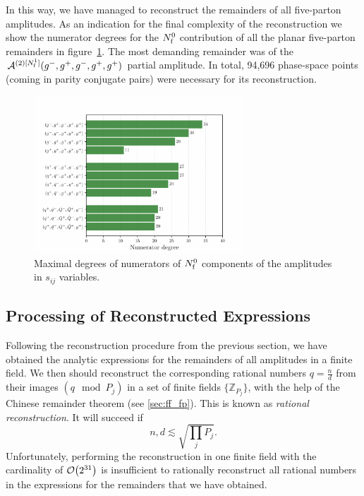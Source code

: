 In this way, we have managed to reconstruct the remainders of all five-parton amplitudes.
As an indication for the final complexity of the reconstruction we show the
numerator degrees for the $N_\mathrm{f}^0$ contribution of all the planar five-parton
remainders in figure~\ref{fig:degrees-all}.
The most demanding remainder was of the $\mathcal{A}^{(2)[N_\mathrm{f}^1]}(g^-,g^+,g^-,g^+,g^+)$ partial amplitude.
In total, 94,696 phase-space points  (coming in parity conjugate pairs) were necessary for its reconstruction.

\begin{figure}[ht]
  \centering
  \includegraphics[width = 0.7\textwidth]{plots/plot_sijs.pdf}
  \caption{Maximal degrees of numerators of $N_\mathrm{f}^0$ components of the amplitudes in $s_{ij}$ variables.}
  \label{fig:degrees-all}
\end{figure}



\subsection{Processing of Reconstructed Expressions}

Following the reconstruction procedure from the previous section, we have obtained the analytic expressions
for the remainders of all amplitudes in a finite field.
We then should reconstruct the corresponding rational numbers $q=\frac{n}{d}$ from
their images $(q \mod P_j)$ in a set of finite fields $\{\mathbb{Z}_{P_j}\}$, 
with the help of the Chinese remainder theorem (see \cref{sec:ff_fp}).
This is known as \emph{rational reconstruction}.
It will succeed if 
\begin{equation} \label{eq:condition_rat_reconstruct}
  n,d \lesssim \sqrt{\prod_jP_j}.
\end{equation}
Unfortunately, performing the reconstruction in one finite field with the cardinality of $\order{2^{31}}$ 
is insufficient to rationally reconstruct all rational numbers in the expressions for the remainders that we have obtained.

